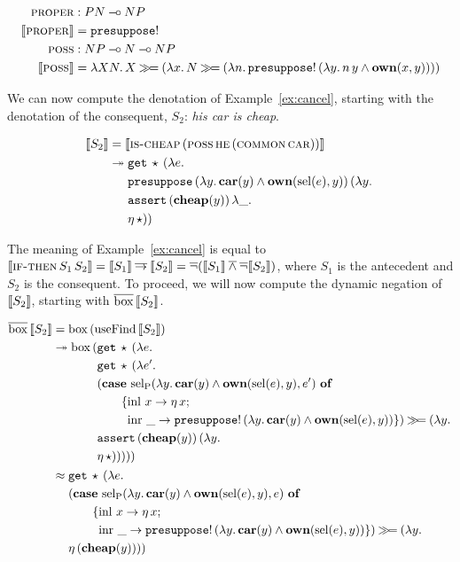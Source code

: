 \begin{align*}
  \textsc{proper} &: PN \mathbin{{-}\mkern-3.5mu{\circ}} NP \\
  \llbracket \textsc{proper} \rrbracket &= \mathtt{presuppose}! \\
  \textsc{poss} &: NP \mathbin{{-}\mkern-3.5mu{\circ}} N \mathbin{{-}\mkern-3.5mu{\circ}} NP \\
  \llbracket \textsc{poss} \rrbracket &= \lambda X N.\, X \mathbin{\gg\!=} (\lambda x.\, N \mathbin{\gg\!=} (\lambda n.\, \mathtt{presuppose}!\,(\lambda y.\, n\,y \land \textbf{own}(x, y))))
\end{align*}

We can now compute the denotation of Example~\ref{ex:cancel}, starting with
the denotation of the consequent, $S_2$: \emph{his car is cheap}.

\begin{align*}
  \llbracket S_2 \rrbracket
  &= \llbracket \textsc{is-cheap}\,(\textsc{poss}\,\textsc{he}\,(\textsc{common}\,\textsc{car})) \rrbracket \\
  &\twoheadrightarrow \begin{aligned}[t]
    &\mathtt{get}\,\star\,(\lambda e.\,  \\
    &\mathtt{presuppose}\,(\lambda y.\, \textbf{car}(y) \land \textbf{own}(\operatorname{sel}(e), y))\,(\lambda y.\,  \\
    &\mathtt{assert}\,(\textbf{cheap}(y))\,\lambda \_.\,  \\
    &\eta\,\star))
    \end{aligned}
\end{align*}

The meaning of Example~\ref{ex:cancel} is equal to
$\llbracket \textsc{if-then}\,S_1\,S_2 \rrbracket = \llbracket S_1 \rrbracket \mathbin{\overline{\to}} \llbracket S_2 \rrbracket =
\mathop{\overline{\lnot}}(\llbracket S_1 \rrbracket \mathbin{\overline{\land}} \mathop{\overline{\lnot}} \llbracket S_2 \rrbracket)$, where $S_1$ is the antecedent and
$S_2$ is the consequent. To proceed, we will now compute the dynamic
negation of $\llbracket S_2 \rrbracket$, starting with $\overline{\mathrm{box}}\,\llbracket S_2 \rrbracket$.

\begin{align*}
  \overline{\mathrm{box}}\,\llbracket S_2 \rrbracket
  &= \mathrm{box}\,(\operatorname{useFind}\,\llbracket S_2 \rrbracket) \\
  &\twoheadrightarrow \mathrm{box}\,(\begin{aligned}[t]
     &\mathtt{get}\,\star\,(\lambda e.\,  \\
     &\mathtt{get}\,\star\,(\lambda e'.\,  \\
     &(\text{\textbf{case} $\operatorname{sel_P}(\lambda y.\, \textbf{car}(y) \land \textbf{own}(\operatorname{sel}(e), y), e')$ \textbf{of}} \\ &\qquad \{\operatorname{inl}\,x \to \eta\,x; \\ &\qquad \ \operatorname{inr}\,\_ \to \mathtt{presuppose}!\,(\lambda y.\, \textbf{car}(y) \land \textbf{own}(\operatorname{sel}(e), y)) \}) \mathbin{\gg\!=} (\lambda y.\,  \\
     &\mathtt{assert}\,(\textbf{cheap}(y))\,(\lambda y.\,  \\
     &\eta\,\star)))))
     \end{aligned} \\
  &\approx \begin{aligned}[t]
     &\mathtt{get}\,\star\,(\lambda e.\,  \\
     &(\text{\textbf{case} $\operatorname{sel_P}(\lambda y.\, \textbf{car}(y) \land \textbf{own}(\operatorname{sel}(e), y), e)$ \textbf{of}} \\ &\qquad \{\operatorname{inl}\,x \to \eta\,x; \\ &\qquad \ \operatorname{inr}\,\_ \to \mathtt{presuppose}!\,(\lambda y.\, \textbf{car}(y) \land \textbf{own}(\operatorname{sel}(e), y)) \}) \mathbin{\gg\!=} (\lambda y.\,  \\
     &\eta\,(\textbf{cheap}(y))))
     \end{aligned}
\end{align*}

